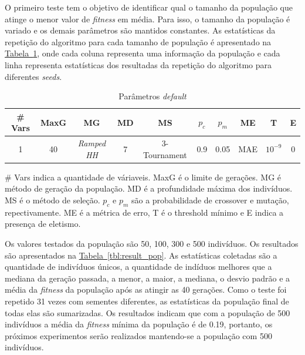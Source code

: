 \documentclass[a4paper]{article}
\begin{document}
O primeiro teste tem o objetivo de identificar qual o tamanho da população que
atinge o menor valor de \textit{fitness} em média. Para isso, o tamanho da
população é variado e os demais parâmetros são mantidos constantes. As
estatísticas da repetição do algoritmo para cada tamanho de população é
apresentado na \hyperref[tbl:default_param]{Tabela~\ref*{tbl:default_param}},
onde cada coluna representa uma informação da população e cada linha representa
estatísticas dos resultadas da repetição do algoritmo para diferentes
\textit{seeds}.

\noindent
\begin{table}
  \center
  \caption{Parâmetros \textit{default}}
  \label{tbl:default_param}
  \begin{tabular}{| c | c | c | c | c | c | c | c | c | c |}
    \hline
    \# Vars & MaxG & MG & MD & MS & $p_c$ & $p_m$ & ME & T & E \\
    \hline
    1 & 40 & \textit{Ramped HH} & 7 & 3-Tournament & 0.9 & 0.05 & MAE & $10^{-9}$ & 0 \\
    \hline
  \end{tabular}
  \begin{minipage}{.9\textwidth}{\center {} \footnotesize \# Vars indica a quantidade de
      váriaveis. MaxG é o limite de gerações. MG é método de geração da
      população. MD é a profundidade máxima dos indivíduos. MS é o método de
      seleção.  $p_c$ e $p_m$ são a probabilidade de crossover e mutação,
      repectivamente. ME é a métrica de erro, T é o threshold mínimo e E indica
      a presença de eletismo.}\end{minipage}
\end{table}

Os valores testados da população são 50, 100, 300 e 500 indivíduos. Os resultados
são apresentados na \hyperref[tbl:result_pop]{Tabela~\ref*{tbl:result_pop}}.
As estatísticas coletadas são a quantidade de indivíduos únicos, a quantidade de
indíduos melhores que a mediana da geração passada, a menor, a maior, a mediana,
o desvio padrão e a média da \textit{fitness} da população após as atingir as
40 gerações. Como o teste foi repetido 31 vezes com sementes diferentes, as
estatísticas da população final de todas elas são sumarizadas. Os resultados
indicam que com a população de 500 indivíduos a média da \textit{fitness} mínima
da população é de 0.19, portanto, os próximos experimentos serão realizados
mantendo-se a população com 500 indivíduos.
\end{document}
